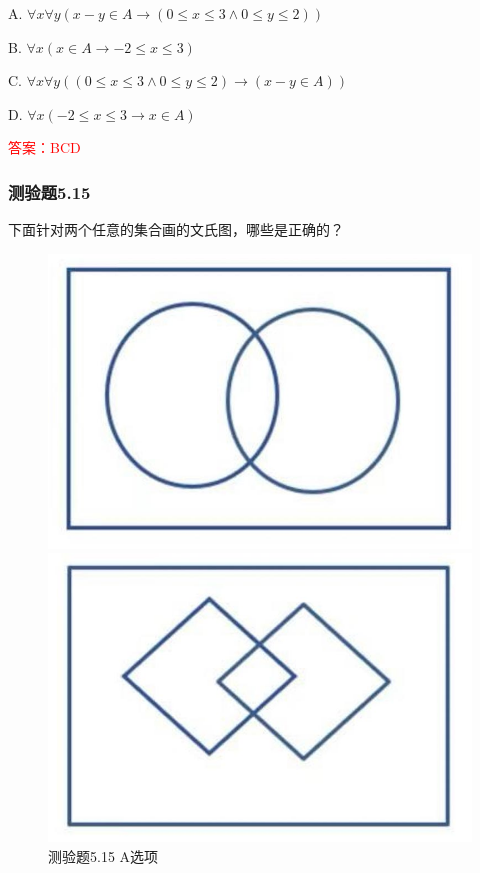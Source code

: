 \documentclass[UTF8, heading=true]{ctexart}
\begin{document}
A. 
$
\forall x \forall y(x-y \in A \rightarrow(0 \leq x \leq 3 \wedge 0 \leq y \leq 2))
$

B. 
$
\forall x(x \in A \rightarrow-2 \leq x \leq 3)
$

C. 
$
\forall x \forall y((0 \leq x \leq 3 \wedge 0 \leq y \leq 2) \rightarrow(x-y \in A))
$

D. 
$
\forall x(-2 \leq x \leq 3 \rightarrow x \in A)
$

\textcolor{red}{答案：BCD}

\subsubsection{测验题5.15}

下面针对两个任意的集合画的文氏图，哪些是正确的？

\begin{figure}[htbp]
    \centering
    \begin{minipage}[t]{0.3\textwidth}
        \centering
        \includegraphics[width=1\textwidth]{5.15_1.jpg} %
        \caption{测验题5.15 A选项}
    \end{minipage}
	  \hspace{0.1\textwidth} %
    \begin{minipage}[t]{0.3\textwidth}
        \centering
        \includegraphics[width=1\textwidth]{5.15_2.jpg} %

\end{minipage}
\end{figure}
\end{document}

